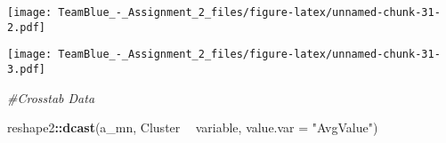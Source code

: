 \documentclass[]{article}
\newenvironment{Shaded}{\begin{snugshade}}{\end{snugshade}}
\newcommand{\KeywordTok}[1]{\textcolor[rgb]{0.13,0.29,0.53}{\textbf{#1}}}
\newcommand{\DataTypeTok}[1]{\textcolor[rgb]{0.13,0.29,0.53}{#1}}
\newcommand{\FloatTok}[1]{\textcolor[rgb]{0.00,0.00,0.81}{#1}}
\newcommand{\StringTok}[1]{\textcolor[rgb]{0.31,0.60,0.02}{#1}}
\newcommand{\CommentTok}[1]{\textcolor[rgb]{0.56,0.35,0.01}{\textit{#1}}}
\newcommand{\OperatorTok}[1]{\textcolor[rgb]{0.81,0.36,0.00}{\textbf{#1}}}
\newcommand{\NormalTok}[1]{#1}
\begin{document}
\texttt{[image: TeamBlue\_-\_Assignment\_2\_files/figure-latex/unnamed-chunk-31-2.pdf]}

\begin{Shaded}
\end{Shaded}

\texttt{[image: TeamBlue\_-\_Assignment\_2\_files/figure-latex/unnamed-chunk-31-3.pdf]}

\begin{Shaded}
\begin{Highlighting}[]
\CommentTok{#Crosstab Data}

\NormalTok{reshape2}\OperatorTok{::}\KeywordTok{dcast}\NormalTok{(a_mn, Cluster }\OperatorTok{~}\StringTok{ }\NormalTok{variable, }\DataTypeTok{value.var =} \StringTok{"AvgValue"}\NormalTok{)}
\end{Highlighting}
\end{Shaded}
\end{document}
